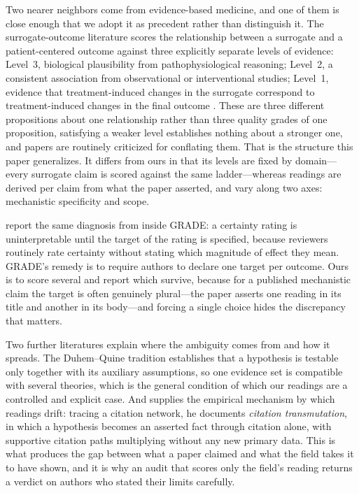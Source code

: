 \documentclass{article}
\begin{document}
Two nearer neighbors come from evidence-based medicine, and one of them is close enough that we adopt it as precedent rather than distinguish it. The surrogate-outcome literature scores the relationship between a surrogate and a patient-centered outcome against three explicitly separate levels of evidence: Level~3, biological plausibility from pathophysiological reasoning; Level~2, a consistent association from observational or interventional studies; Level~1, evidence that treatment-induced changes in the surrogate correspond to treatment-induced changes in the final outcome \citep{euhta2024outcomes}. These are three different propositions about one relationship rather than three quality grades of one proposition, satisfying a weaker level establishes nothing about a stronger one, and papers are routinely criticized for conflating them. That is the structure this paper generalizes. It differs from ours in that its levels are fixed by domain---every surrogate claim is scored against the same ladder---whereas readings are derived per claim from what the paper asserted, and vary along two axes: mechanistic specificity and scope.

\citet{hultcrantz2017grade} report the same diagnosis from inside GRADE: a certainty rating is uninterpretable until the target of the rating is specified, because reviewers routinely rate certainty without stating which magnitude of effect they mean. GRADE's remedy is to require authors to declare one target per outcome. Ours is to score several and report which survive, because for a published mechanistic claim the target is often genuinely plural---the paper asserts one reading in its title and another in its body---and forcing a single choice hides the discrepancy that matters.

Two further literatures explain where the ambiguity comes from and how it spreads. The Duhem--Quine tradition \citep{duhem1954aim,quine1951dogmas} establishes that a hypothesis is testable only together with its auxiliary assumptions, so one evidence set is compatible with several theories, which is the general condition of which our readings are a controlled and explicit case. And \citet{greenberg2009citation} supplies the empirical mechanism by which readings drift: tracing a citation network, he documents \emph{citation transmutation}, in which a hypothesis becomes an asserted fact through citation alone, with supportive citation paths multiplying without any new primary data. This is what produces the gap between what a paper claimed and what the field takes it to have shown, and it is why an audit that scores only the field's reading returns a verdict on authors who stated their limits carefully.
\end{document}
